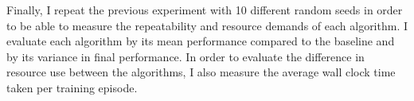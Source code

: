 Finally, I repeat the previous experiment with 10 different random seeds in order to be able to measure the repeatability and resource demands of each algorithm.
I evaluate each algorithm by its mean performance compared to the baseline and by its variance in final performance.
In order to evaluate the difference in resource use between the algorithms, I also measure the average wall clock time taken per training episode.